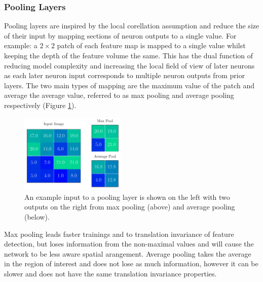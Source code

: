 \subsubsection{Pooling Layers}
Pooling layers are inspired by the local corellation assumption and reduce the size of their input by mapping sections of neuron outputs to a single value. For example: a $2\times{}2$ patch of each feature map is mapped to a single value whilst keeping the depth of the feature volume the same.
This has the dual function of reducing model complexity and increasing the local field of view of later neurons as each later neuron input corresponds to multiple neuron outputs from prior layers. 
The two main types of mapping are the maximum value of the patch and average the average value, referred to as max pooling and average pooling respectively (Figure \ref{fig:machine_learning:pooling}). 
\begin{figure}[h!]
    \includegraphics[width=0.45\textwidth]{figures/machine_learning/pooling.pdf}
    \caption{An example input to a pooling layer is shown on the left with two outputs on the right from max pooling (above) and average pooling (below).}
        \label{fig:machine_learning:pooling}
\end{figure}

Max pooling leads faster trainings and to translation invariance of feature detection, but loses information from the non-maximal values and will cause the network to be less aware spatial arangement.  
Average pooling takes the average in the region of interest and does not lose as much information, however it can be slower and does not have the same translation invariance properties. 


